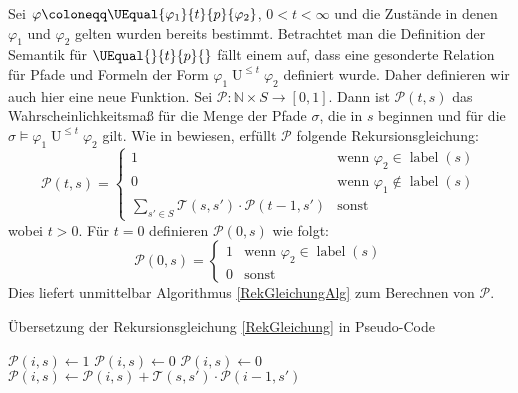 Sei $\varphi \coloneqq \UEqual{\varphi_1}{t}{p}{\varphi_2}$, $0<t<\infty$ und die Zustände in denen $\varphi_1$ und $\varphi_2$ gelten wurden bereits bestimmt. 
Betrachtet man die Definition der Semantik für $\UEqual{}{t}{p}{}$ fällt einem auf, dass eine gesonderte Relation für Pfade und Formeln der Form $\varphi_1 \operatorname{U}^{\leq t} \varphi_2$ definiert wurde. 
Daher definieren wir auch hier eine neue Funktion. 
Sei $\mathcal{P}:\mathbb{N}\times S \to [0,1]$. 
Dann ist $\mathcal{P}(t,s)$ das Wahrscheinlichkeitsmaß für die Menge der Pfade $\sigma$, die in $s$ beginnen und für die $\sigma\models \varphi_1 \operatorname{U}^{\leq t} \varphi_2$ gilt. 
Wie in \cite{hansson1994logic} bewiesen, erfüllt $\mathcal{P}$ folgende Rekursionsgleichung:
\begin{equation}
	\mathcal{P}(t,s) = 
	\begin{cases}
		1 & \text{wenn } \varphi_2\in \operatorname{label}(s) \\
		0 & \text{wenn } \varphi_1 \notin \operatorname{label}(s) \\
		\sum_{s'\in S} \mathcal{T}(s,s')\cdot \mathcal{P}(t-1,s') & \text{sonst}
	\end{cases}
	\label{RekGleichung}
\end{equation}
wobei $t>0$. Für $t=0$ definieren $\mathcal{P}(0,s)$ wie folgt:
\begin{equation}
	\mathcal{P}(0,s) =
	\begin{cases}
		1 & \text{wenn } \varphi_2 \in \operatorname{label}(s) \\
		0 & \text{sonst }
	\end{cases}
\end{equation}
Dies liefert unmittelbar Algorithmus \ref{RekGleichungAlg} zum Berechnen von $\mathcal{P}$.

\begin{algorithm}[h]
	\caption{Übersetzung der Rekursionsgleichung \ref{RekGleichung} in Pseudo-Code \cite{hansson1994logic}}
	\label{RekGleichungAlg}
	\begin{algorithmic}
		\State $\mathcal{P}(i,s) \gets 1$
		\State $\mathcal{P}(i,s) \gets 0$
		\Else
		\State $\mathcal{P}(i,s)\gets 0$
		\State $\mathcal{P}(i,s)\gets \mathcal{P}(i,s)+\mathcal{T}(s,s')\cdot \mathcal{P}(i-1,s')$
		\EndFor
		\EndIf
		\EndIf
		\EndFor
		\EndFor
	\end{algorithmic}
\end{algorithm}

